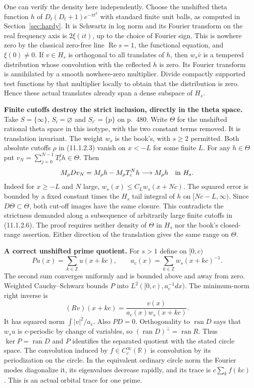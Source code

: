 \documentclass[11pt,letterpaper]{article}
\newcommand{\R}{\mathbb R}
\newcommand{\Z}{\mathbb Z}
\newcommand{\ran}{\operatorname{ran}}
\newcommand{\re}{\operatorname{Re}}
\newcommand{\head}[1]{\par\smallskip\textbf{#1}\enspace}
\begin{document}
One can verify the density here independently. Choose the unshifted theta function $h$ of $D_t(D_t+1)e^{-\pi t^2}$ with standard finite unit balls, as computed in Section~\ref{sec:hardy}. It is Schwartz in log norm and its Fourier transform on the real frequency axis is $2\xi(it)$, up to the choice of Fourier sign. This is nowhere zero by the classical zero-free line $\re s=1$, the functional equation, and $\xi(0)\ne0$. If $v\in H_s$ is orthogonal to all translates of $h$, then $w_s\bar v$ is a tempered distribution whose convolution with the reflected $h$ is zero. Its Fourier transform is annihilated by a smooth nowhere-zero multiplier. Divide compactly supported test functions by that multiplier locally to obtain that the distribution is zero. Hence these actual translates already span a dense subspace of $H_s$.

\head{Finite cutoffs destroy the strict inclusion, directly in the theta space.}
Take $S=\{\infty\}$, $S_i=\varnothing$ and $S_{i'}=\{p\}$ on p.~480. Write $\Theta$ for the unshifted rational theta space in this isotype, with the two constant terms removed. It is translation invariant. The weight $w_s$ is the book's, with $s\ge2$ permitted. Both absolute cutoffs $\rho$ in (11.1.2.3) vanish on $x<-L$ for some finite $L$. For any $h\in\Theta$ put $v_N=\sum_{j=0}^{N-1}T_c^j h\in\Theta$. Then
\[
 M_\rho Dv_N=M_\rho h-M_\rho T_c^N h \longrightarrow M_\rho h\quad\hbox{in }H_s.
\]
Indeed for $x\ge-L$ and $N$ large, $w_s(x)\le C_L w_s(x+Nc)$. The squared error is bounded by a fixed constant times the $H_s$ tail integral of $h$ on $[Nc-L,\infty)$. Since $D\Theta\subset\Theta$, both cut-off images have the same closure. This contradicts the strictness demanded along a subsequence of arbitrarily large finite cutoffs in (11.1.2.6). The proof requires neither density of $\Theta$ in $H_s$ nor the book's closed-range assertion. Either direction of the translation gives the same range on $\Theta$.

\head{A correct unshifted prime quotient.}
For $s>1$ define on $[0,c)$
\[
 Pu(x)=\sum_{k\in\Z}u(x+kc),\qquad a_c(x)=\sum_{k\in\Z}w_s(x+kc)^{-1}.
\]
The second sum converges uniformly and is bounded above and away from zero. Weighted Cauchy--Schwarz bounds $P$ into $L^2([0,c),a_c^{-1}dx)$. The minimum-norm right inverse is
\[
 (Rv)(x+kc)=\frac{v(x)}{a_c(x)w_s(x+kc)}.
\]
It has squared norm $\int |v|^2/a_c$. Also $PD=0$. Orthogonality to $\ran D$ says that $w_s u$ is $c$-periodic by change of variables, so $(\ran D)^\perp=\ran R$. Thus $\ker P=\overline{\ran D}$ and $P$ identifies the separated quotient with the stated circle space. The convolution induced by $f\in C_c^\infty(\R)$ is convolution by its periodization on the circle. In the equivalent ordinary circle norm the Fourier modes diagonalize it, its eigenvalues decrease rapidly, and its trace is $c\sum_k f(kc)$. This is an actual orbital trace for one prime.
\end{document}
